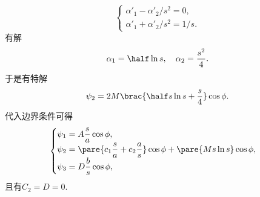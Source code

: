 \documentclass[hidelinks]{ctexart}
\begin{document}
\begin{sample}
\begin{ex}
\[\begin{cases}
            \alpha'_1 - \alpha'_2/s^2 = 0, \\
            \alpha'_1 + \alpha'_2/s^2 = 1/s.
        \end{cases} \]
        有解
        \[ \alpha_1 = \half \ln s,\quad \alpha_2 = \frac{s^2}{4}. \]
        于是有特解
        \[ \psi_2 = 2M\brac{\half s\ln s + \frac{s}{4}}\cos\phi. \]
        代入边界条件可得
        \[ \begin{cases}
            \displaystyle \psi_1 = A\frac{s}{a}\cos\phi, \\
            \displaystyle \psi_2 = \pare{c_1 \frac{s}{a} + c_2 \frac{a}{s}}\cos\phi + \pare{M s\ln s}\cos\phi, \\
            \displaystyle \psi_3 = D\frac{b}{s}\cos\phi,
        \end{cases} \]
        且有$C_2 = D = 0$.
    \end{ex}
\end{sample}



\end{document}
